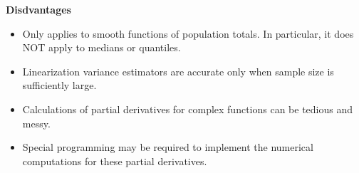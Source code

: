 \vskip 0.5cm
\noindent
\textbf{Disdvantages}
\begin{itemize}
\item
	Only applies to smooth functions of population totals.
	In particular, it does NOT apply to medians or quantiles.
\item
	Linearization variance estimators are accurate only when sample size is sufficiently large.
\item
	Calculations of partial derivatives for complex functions can be tedious and messy.
\item
	Special programming may be required to implement the numerical computations for these partial derivatives.
\end{itemize}


\renewcommand{\theenumi}{\roman{enumi}}
\renewcommand{\labelenumi}{\textnormal{(\theenumi)}$\;\;$}

